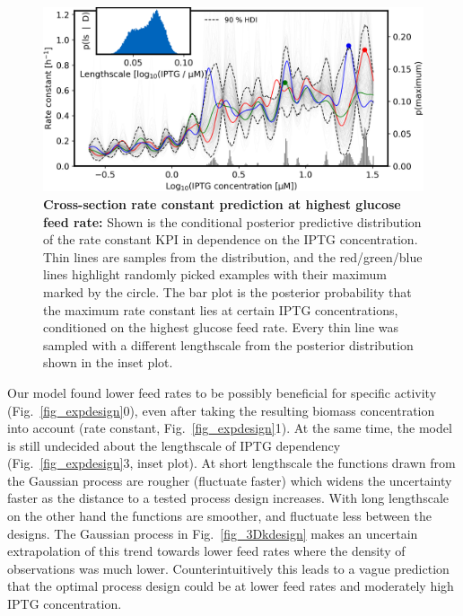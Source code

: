 \documentclass[sn-standardnature]{sn-jnl}%
\theoremstyle{thmstyleone}%
\theoremstyle{thmstyletwo}%
\theoremstyle{thmstylethree}%
\begin{document}
\begin{figure}[H]
    \centering
    \includegraphics[width=1.0\textwidth]{figures/plot_pp_dense_dense_k_design_crossection.png}
    \caption{
        \textbf{Cross-section rate constant prediction at highest glucose feed rate:}
        Shown is the conditional posterior predictive distribution of the rate constant KPI in dependence on the IPTG concentration.
        Thin lines are samples from the distribution, and the red/green/blue lines highlight randomly picked examples with their maximum marked by the circle.
        The bar plot is the posterior probability that the maximum rate constant lies at certain IPTG concentrations, conditioned on the highest glucose feed rate.
        Every thin line was sampled with a different lengthscale from the posterior distribution shown in the inset plot.
    }
    \label{fig_kdesign_crossection}
\end{figure}

Our model found lower feed rates to be possibly beneficial for specific activity (Fig.~\ref{fig_expdesign}0), even after taking the resulting biomass concentration into account (rate constant, Fig.~\ref{fig_expdesign}1).
At the same time, the model is still undecided about the lengthscale of IPTG dependency (Fig.~\ref{fig_expdesign}3, inset plot).
At short lengthscale the functions drawn from the Gaussian process are rougher (fluctuate faster) which widens the uncertainty faster as the distance to a tested  process design increases.
With long lengthscale on the other hand the functions are smoother, and fluctuate less between the designs.
The Gaussian process in Fig.~\ref{fig_3Dkdesign} makes an uncertain extrapolation of this trend towards lower feed rates where the density of observations was much lower.
Counterintuitively this leads to a vague prediction that the optimal process design could be at lower feed rates and moderately high IPTG concentration.
\end{document}
